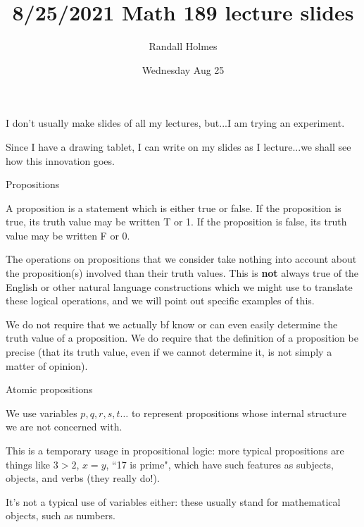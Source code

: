 \documentclass{slides}
\title{8/25/2021 Math 189 lecture slides}
\author{Randall Holmes}
\date{Wednesday Aug 25}
\begin{document}
\begin{slide}

\maketitle

\end{slide}

\begin{slide}

I don't usually make slides of all my lectures, but...I am trying an experiment. 

Since I have a drawing tablet, I can write on my slides as I lecture...we shall see how this innovation goes.

\end{slide}

\begin{slide}

{\Large Propositions}

A proposition is a statement which is either true or false.  If the proposition is true, its truth value may be written T or 1.
If the proposition is false, its truth value may be written F or 0.  

The operations on propositions that we consider take nothing into account about the proposition(s) involved than their truth values.  This is {\bf not} always true of the English or other natural language constructions which we might use to translate these logical operations, and we will point out specific examples of this.

We do not require that we actually {bf know} or can even easily determine the truth value of a proposition.  We do require that the definition of a proposition be precise (that its truth value, even if we cannot determine it, is not simply a matter of opinion).

\end{slide}

\begin{slide}

{\Large Atomic propositions}

We use variables $p,q,r,s,t\ldots$ to represent propositions whose internal structure we are not concerned with.   

This is a temporary usage in propositional logic:  more typical propositions are things like $3>2$, $x=y$, ``17 is prime", which have such features as subjects, objects, and verbs (they really do!).

It's not a typical use of variables either:  these usually stand for mathematical objects, such as numbers.

\end{slide}
\end{document}
